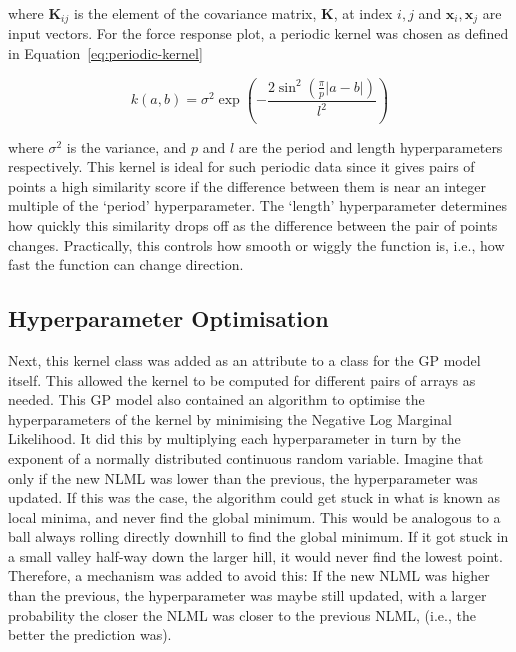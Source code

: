 \documentclass[12pt]{article}
\begin{document}
    where $\mathbf{K}_{ij}$ is the element of the covariance matrix, $\mathbf{K}$, at index $i, j$ and $\mathbf{x}_i, \mathbf{x}_j$ are input vectors.
    For the force response plot, a periodic kernel was chosen as defined in Equation~\ref{eq:periodic-kernel}

    \begin{equation}
        k(a, b) = \sigma^2 \exp\left(- \frac{2 \sin^2\left(\frac{\pi}{p} |a - b|\right)}{l^2}\right)\label{eq:periodic-kernel}
    \end{equation}

    where $\sigma^2$ is the variance, and $p$ and $l$ are the period and length hyperparameters respectively.
    This kernel is ideal for such periodic data since it gives pairs of points a high similarity score if the difference between them is near an integer multiple of the `period' hyperparameter.
    The `length' hyperparameter determines how quickly this similarity drops off as the difference between the pair of points changes.
    Practically, this controls how smooth or wiggly the function is, i.e., how fast the function can change direction.

    \subsection{Hyperparameter Optimisation}
    Next, this kernel class was added as an attribute to a class for the GP model itself.
    This allowed the kernel to be computed for different pairs of arrays as needed.
    This GP model also contained an algorithm to optimise the hyperparameters of the kernel by minimising the Negative Log Marginal Likelihood.
    It did this by multiplying each hyperparameter in turn by the exponent of a normally distributed continuous random variable.
    Imagine that only if the new NLML was lower than the previous, the hyperparameter was updated.
    If this was the case, the algorithm could get stuck in what is known as local minima, and never find the global minimum.
    This would be analogous to a ball always rolling directly downhill to find the global minimum.
    If it got stuck in a small valley half-way down the larger hill, it would never find the lowest point.
    Therefore, a mechanism was added to avoid this:
    If the new NLML was higher than the previous, the hyperparameter was maybe still updated, with a larger probability the closer the NLML was closer to the previous NLML, (i.e., the better the prediction was).
\end{document}
